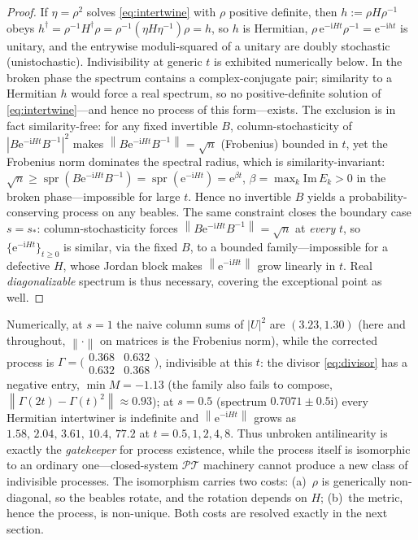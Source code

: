 \documentclass[11pt]{article}
\theoremstyle{definition}
\theoremstyle{remark}
\newcommand{\PT}{\mathcal{PT}}
\newcommand{\ii}{\mathrm{i}}
\newcommand{\ee}{\mathrm{e}}
\newcommand{\Gam}{\Gamma}
\newcommand{\norm}[1]{\left\lVert #1 \right\rVert}
\begin{document}
\begin{proof}
If $\eta=\rho^{2}$ solves \eqref{eq:intertwine} with $\rho$ positive
definite, then $h:=\rho H\rho^{-1}$ obeys
$h^{\dagger}=\rho^{-1}H^{\dagger}\rho
=\rho^{-1}(\eta H\eta^{-1})\rho=h$, so $h$ is Hermitian,
$\rho\,\ee^{-\ii Ht}\rho^{-1}=\ee^{-\ii ht}$ is unitary, and the
entrywise moduli-squared of a unitary are doubly stochastic
(unistochastic). Indivisibility at generic $t$ is exhibited
numerically below. In the broken phase the spectrum contains a
complex-conjugate pair; similarity to a Hermitian $h$ would force a
real spectrum, so no positive-definite solution of
\eqref{eq:intertwine}---and hence no process of this form---exists. The
exclusion is in fact similarity-free: for any fixed invertible $B$,
column-stochasticity of $|B\ee^{-\ii Ht}B^{-1}|^{2}$ makes
$\norm{B\ee^{-\ii Ht}B^{-1}}=\sqrt n$ (Frobenius) bounded in $t$, yet the
Frobenius norm dominates the spectral radius, which is
similarity-invariant:
$\sqrt n\ge\operatorname{spr}(B\ee^{-\ii Ht}B^{-1})=\operatorname{spr}(\ee^{-\ii Ht})=\ee^{\beta t}$,
$\beta=\max_k\mathrm{Im}\,E_k>0$ in the broken phase---impossible for
large $t$. Hence no invertible $B$ yields a probability-conserving
process on any beables. The same constraint closes the boundary case
$s=s_*$: column-stochasticity forces $\norm{B\ee^{-\ii Ht}B^{-1}}=\sqrt n$
at \emph{every} $t$, so $\{\ee^{-\ii Ht}\}_{t\ge0}$ is similar, via the fixed
$B$, to a bounded family---impossible for a defective $H$, whose Jordan
block makes $\norm{\ee^{-\ii Ht}}$ grow linearly in $t$. Real
\emph{diagonalizable} spectrum is thus necessary, covering the exceptional
point as well.
\end{proof}

Numerically, at $s=1$ the naive column sums of $|U|^2$ are $(3.23,1.30)$
(here and throughout, $\norm{\cdot}$ on matrices is the Frobenius
norm), while the corrected process is
$\Gam=\bigl(\begin{smallmatrix}0.368&0.632\\0.632&0.368\end{smallmatrix}\bigr)$,
indivisible at this $t$: the divisor \eqref{eq:divisor} has a negative
entry, $\min M=-1.13$ (the family also fails to compose,
$\norm{\Gam(2t)-\Gam(t)^{2}}\approx 0.93$); at $s=0.5$ (spectrum
$0.7071\pm 0.5\ii$) every Hermitian intertwiner is indefinite and
$\norm{\ee^{-\ii Ht}}$ grows as $1.58,\,2.04,\,3.61,\,10.4,\,77.2$ at
$t=0.5,1,2,4,8$. Thus unbroken antilinearity is exactly the
\emph{gatekeeper} for process existence, while the process itself is
isomorphic to an ordinary one---closed-system $\PT$ machinery cannot
produce a new class of indivisible processes. The isomorphism carries two
costs: (a)~$\rho$ is generically non-diagonal, so the beables rotate, and
the rotation depends on $H$; (b)~the metric, hence the process, is
non-unique. Both costs are resolved exactly in the next section.
\end{document}
